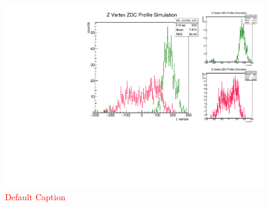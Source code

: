 \begin{figure}
\begin{center}
\includegraphics[width=\linewidth,height=\textheight,keepaspectratio]{./figures/hsigma}
\caption{ \textcolor{red}{Default Caption} }
\label{fig:hsigma}
\end{center}
\end{figure}

